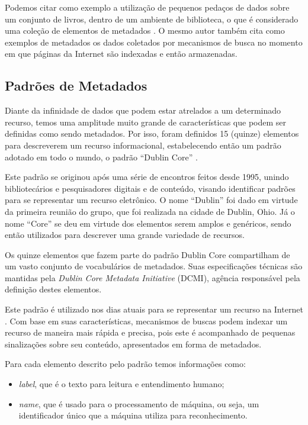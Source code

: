 Podemos citar como exemplo a utilização de pequenos pedaços de dados sobre um conjunto de livros, dentro de um ambiente de biblioteca, o que é considerado uma coleção de elementos de metadados \cite{meta-dados}. O mesmo autor também cita como exemplos de metadados os dados coletados por mecanismos de busca no momento em que páginas da Internet são indexadas e então armazenadas.

\subsection{Padrões de Metadados}
\label{ssec:metadata-patterns}

Diante da infinidade de dados que podem estar atrelados a um determinado recurso, temos uma amplitude muito grande de características que podem ser definidas como sendo metadados. Por isso, foram definidos 15 (quinze) elementos para descreverem um recurso informacional, estabelecendo então um padrão adotado em todo o mundo, o padrão ``Dublin Core'' \cite{dublin-core}.

Este padrão se originou após uma série de encontros feitos desde 1995, unindo bibliotecários e pesquisadores digitais e de conteúdo, visando identificar padrões para se representar um recurso eletrônico. O nome ``Dublin'' foi dado em virtude da primeira reunião do grupo, que foi realizada na cidade de Dublin, Ohio. Já o nome ``Core'' se deu em virtude dos elementos serem amplos e genéricos, sendo então utilizados para descrever uma grande variedade de recursos.

Os quinze elementos que fazem parte do padrão Dublin Core compartilham de um vasto conjunto de vocabulários de metadados. Suas especificações técnicas são mantidas pela \emph{Dublin Core Metadata Initiative} (DCMI), agência responsável pela definição destes elementos.

Este padrão é utilizado nos dias atuais para se representar um recurso na Internet \cite{dublin-core-1-1}. Com base em suas características, mecanismos de buscas podem indexar um recurso de maneira mais rápida e precisa, pois este é acompanhado de pequenas sinalizações sobre seu conteúdo, apresentados em forma de metadados. 

Para cada elemento descrito pelo padrão temos informações como: 

\begin{itemize}
    \item \textit{label}, que é o texto para leitura e entendimento humano;
    \item \textit{name}, que é usado para o processamento de máquina, ou seja, um identificador único que a máquina utiliza para reconhecimento.
\end{itemize}

